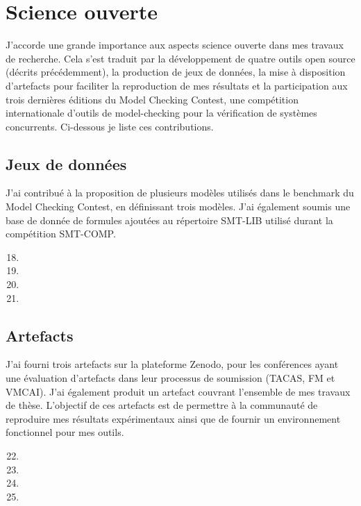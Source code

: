 \section{Science ouverte}
\vspace{10pt}
J'accorde une grande importance aux aspects \og science ouverte \fg dans mes travaux
de recherche. Cela s'est traduit par la développement de quatre outils open
source (décrits précédemment), la production de jeux de données, la mise à
disposition d'artefacts pour faciliter la reproduction de mes résultats et la
participation aux trois dernières éditions du Model Checking Contest, une
compétition internationale d'outils de model-checking pour la vérification de
systèmes concurrents. Ci-dessous je liste ces contributions.

\vspace{10pt}
\subsection{Jeux de données}
\vspace{10pt}
J'ai contribué à la proposition de plusieurs modèles utilisés dans le benchmark du Model Checking Contest, en 
définissant trois modèles. J'ai également soumis une base de donnée de formules ajoutées au répertoire SMT-LIB
utilisé durant la compétition SMT-COMP.
\vspace{5pt}
\begin{enumerate}
  \setcounter{enumi}{17}
  \item {}\smallbreak
  \item {}\smallbreak
  \item {}\smallbreak
  \item {}
\end{enumerate}

\vspace{10pt}
\subsection{Artefacts}
\vspace{5pt}

J'ai fourni trois artefacts sur la plateforme \textsf{Zenodo}, pour les
conférences ayant une évaluation d'artefacts dans leur processus de soumission
(TACAS, FM et VMCAI). J'ai également produit un artefact couvrant l'ensemble de
mes travaux de thèse. L'objectif de ces artefacts est de permettre à la
communauté de reproduire mes résultats expérimentaux ainsi que de fournir un
environnement fonctionnel pour mes outils.
\vspace{1pt}
\begin{enumerate}
  \setcounter{enumi}{21}
  \item {}\smallbreak
  \item {}\smallbreak
  \item {}\smallbreak
  \item {}
\end{enumerate}
\newpage


